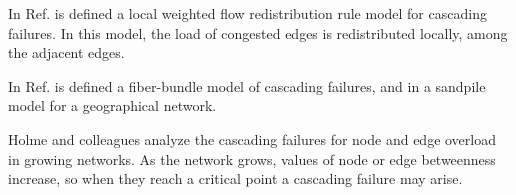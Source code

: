 \documentclass[12pt]{article}
\begin{document}
In Ref. \cite{Wang2008} is defined a local weighted flow redistribution rule model for cascading failures. In this model, the load of congested edges is redistributed locally, among the adjacent edges.\medskip

In Ref. \cite{Moreno2002} is defined a fiber-bundle model of cascading failures, and in \cite{Huang2006} a sandpile model for a geographical network.\medskip

Holme and colleagues analyze the cascading failures for node \cite{Holme2002b} and edge \cite{Holme2002c} overload in growing networks. As the network grows, values of node or edge betweenness increase, so when they reach a critical point a cascading failure may arise.\medskip

\medskip

\nocite{*}



\end{document}
